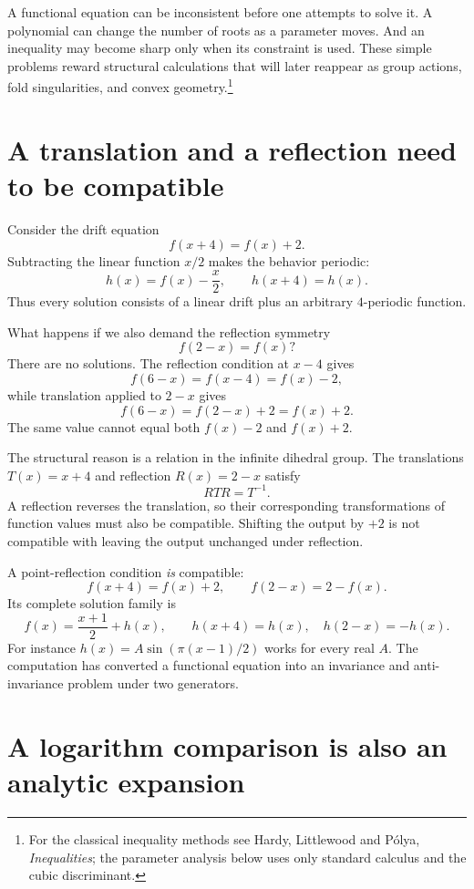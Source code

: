 
A functional equation can be inconsistent before one attempts to solve it. A polynomial can change the number of roots as a parameter moves. And an inequality may become sharp only when its constraint is used. These simple problems reward structural calculations that will later reappear as group actions, fold singularities, and convex geometry.\footnote{For the classical inequality methods see Hardy, Littlewood and P\'olya, \emph{Inequalities}; the parameter analysis below uses only standard calculus and the cubic discriminant.}

\section{A translation and a reflection need to be compatible}

Consider the drift equation
\[
 f(x+4)=f(x)+2.
\]
Subtracting the linear function \(x/2\) makes the behavior periodic:
\[
 h(x)=f(x)-\frac x2,\qquad h(x+4)=h(x).
\]
Thus every solution consists of a linear drift plus an arbitrary \(4\)-periodic function.

What happens if we also demand the reflection symmetry
\[
 f(2-x)=f(x)?
\]
There are no solutions. The reflection condition at \(x-4\) gives
\[
 f(6-x)=f(x-4)=f(x)-2,
\]
while translation applied to \(2-x\) gives
\[
 f(6-x)=f(2-x)+2=f(x)+2.
\]
The same value cannot equal both \(f(x)-2\) and \(f(x)+2\).

The structural reason is a relation in the infinite dihedral group. The translations \(T(x)=x+4\) and reflection \(R(x)=2-x\) satisfy
\[
 RTR=T^{-1}.
\]
A reflection reverses the translation, so their corresponding transformations of function values must also be compatible. Shifting the output by \(+2\) is not compatible with leaving the output unchanged under reflection.

A point-reflection condition \emph{is} compatible:
\[
 f(x+4)=f(x)+2,\qquad f(2-x)=2-f(x).
\]
Its complete solution family is
\[
 \boxed{f(x)=\frac{x+1}{2}+h(x),}
 \qquad h(x+4)=h(x),\quad h(2-x)=-h(x).
\]
For instance \(h(x)=A\sin(\pi(x-1)/2)\) works for every real \(A\). The computation has converted a functional equation into an invariance and anti-invariance problem under two generators.

\section{A logarithm comparison is also an analytic expansion}

